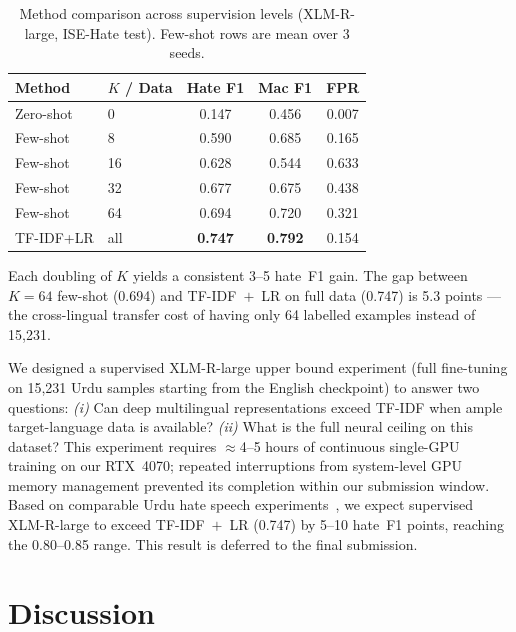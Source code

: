 \documentclass{article}
\begin{document}
\begin{table}[h]
\centering
\caption{Method comparison across supervision levels (XLM-R-large,
         ISE-Hate test). Few-shot rows are mean over 3 seeds.}
\label{tab:ablation}
\vskip 0.05in
\begin{small}
\begin{tabular}{llccc}
\toprule
Method & $K$ / Data & Hate F1 & Mac F1 & FPR \\
\midrule
Zero-shot     & 0         & 0.147 & 0.456 & 0.007 \\
\midrule
Few-shot      & 8         & 0.590 & 0.685 & 0.165 \\
Few-shot      & 16        & 0.628 & 0.544 & 0.633 \\
Few-shot      & 32        & 0.677 & 0.675 & 0.438 \\
Few-shot      & 64        & 0.694 & 0.720 & 0.321 \\
\midrule
TF-IDF+LR     & all       & \textbf{0.747} & \textbf{0.792} & 0.154 \\
\bottomrule
\end{tabular}
\end{small}
\end{table}

Each doubling of $K$ yields a consistent 3--5 hate~F1 gain.
The gap between $K=64$ few-shot (0.694) and TF-IDF~$+$~LR on full data
(0.747) is 5.3 points --- the cross-lingual transfer cost of having
only 64 labelled examples instead of 15{,}231.

We designed a supervised XLM-R-large upper bound experiment
(full fine-tuning on 15{,}231 Urdu samples starting from the English
checkpoint) to answer two questions:
\textit{(i)} Can deep multilingual representations exceed TF-IDF when
ample target-language data is available?
\textit{(ii)} What is the full neural ceiling on this dataset?
This experiment requires $\approx$4--5 hours of continuous single-GPU
training on our RTX~4070; repeated interruptions from system-level GPU
memory management prevented its completion within our submission window.
Based on comparable Urdu hate speech experiments~\citep{ullah2025dambert},
we expect supervised XLM-R-large to exceed TF-IDF~$+$~LR (0.747) by
5--10 hate~F1 points, reaching the 0.80--0.85 range.
This result is deferred to the final submission.

\section{Discussion}
\label{sec:discussion}
\end{document}
